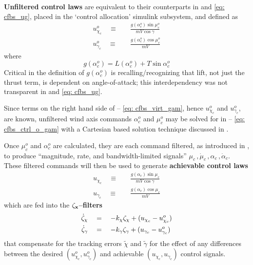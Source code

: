 \documentclass[12pt]{ucthesis}
\begin{document}
\textbf{Unfiltered control laws} are equivalent to their counterparts in  and \ref{eq: cfbs_ug}, placed in the `control allocation' simulink subsystem, and defined as
	\begin{align}
		\label{eq: cfbs_ctrl_o_chi}	u^{o}_{\chi_c} 		\quad \equiv& \quad \frac{g(\alpha^o_c)\sin\mu^o_c}{mV\cos\gamma} \\
		\label{eq: cfbs_ctrl_o_gam}	u^{o}_{\gamma_c} 	\quad \equiv& \quad \frac{g(\alpha^o_c)\cos\mu^o_c}{mV}
	\end{align}
where
\begin{equation} 
	g(\alpha^o_c) = L(\alpha^o_c)+T\sin\alpha^o_c
	\label{eq: g_alph}
\end{equation}
Critical in the definition of $g(\alpha^o_c)$ is recalling/recognizing that lift, not just the thrust term, is dependent on angle-of-attack; this interdependency was not transparent in  and \ref{eq: cfbs_ug}.

Since terms on the right hand side of  -- \ref{eq: cfbs_virt_gam}, hence $u^{o}_{\chi_c}$ and $u^{o}_{\gamma_c}$, are known, unfiltered wind axis commands $\alpha^o_c$ and $\mu^o_c$ may be solved for in  -- \ref{eq: cfbs_ctrl_o_gam} with a Cartesian based solution technique discussed in .

Once $\mu^o_c$ and $\alpha^o_c$ are calculated, they are each command filtered, as introduced in , to produce ``magnitude, rate, and bandwidth-limited signals'' $\mu_c\,,\dot{\mu}_c\,,\alpha_c\,,\dot{\alpha}_c$. These filtered commands will then be used to generate \textbf{achievable control laws}
	\begin{align}
		\label{eq: cfbs_ctrl_chi}	u_{\chi_c} 	\quad \equiv& \quad \frac{g(\alpha_c)\sin\mu_c}{mV\cos\gamma} \\
		\label{eq: cfbs_ctrl_gam}	u_{\gamma_c} 	\quad \equiv& \quad \frac{g(\alpha_c)\cos\mu_c}{mV}
	\end{align}
which are fed into the $\mathbf{\zeta_x}$\textbf{--filters}
	\begin{align}
		\label{eq: cfbs_filt_chi}	\dot{\zeta}_{\chi} \quad&=\quad -k_{\chi} \zeta_{\chi} + (u_{\chi_c} - u^o_{\chi_c}) \\
		\label{eq: cfbs_filt_gam}	\dot{\zeta}_{\gamma} \quad&=\quad -k_{\gamma} \zeta_{\gamma} + (u_{\gamma_c} - u^o_{\gamma_c})
	\end{align}
that compensate for the tracking errors $\tilde{\chi}$ and $\tilde{\gamma}$ for the effect of any differences between the desired $(u^o_{\chi_c},u^o_{\gamma_c})$ and achievable $(u_{\chi_c},u_{\gamma_c})$ control signals.
\end{document}
